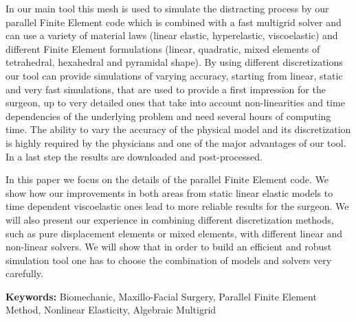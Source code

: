 \documentclass{report}
\begin{document}
In our main tool this mesh is used to simulate the distracting process by
our parallel Finite Element code which is combined with a fast multigrid
solver and can use a variety of material laws (linear elastic,
hyperelastic, viscoelastic) and different Finite Element formulations
(linear, quadratic, mixed elements of tetrahedral, hexahedral and
pyramidal shape). By using different discretizations our tool can provide
simulations of varying accuracy, starting from linear, static and very
fast simulations, that are used to provide a first impression for the
surgeon, up to very detailed ones that take into account non-linearities
and time dependencies of the underlying problem and need several hours of
computing time. The ability to vary the accuracy of the physical model
and its discretization is highly required by the physicians and one of
the major advantages of our tool. In a last step the results are
downloaded and post-processed.

In this paper we focus on the details of the parallel Finite Element
code. We show how our improvements in both areas from static linear
elastic models to time dependent viscoelastic ones lead to more reliable
results for the surgeon. We will also present our experience in combining
different discretization methods, such as pure displacement elements or
mixed elements, with different linear and non-linear solvers. We will
show that in order to build an efficient and robust simulation tool one
has to choose the combination of models and solvers very carefully.

\bigskip

{\bf Keywords:} Biomechanic, Maxillo-Facial Surgery, Parallel Finite
Element Method, Nonlinear Elasticity, Algebraic Multigrid
\end{document}
